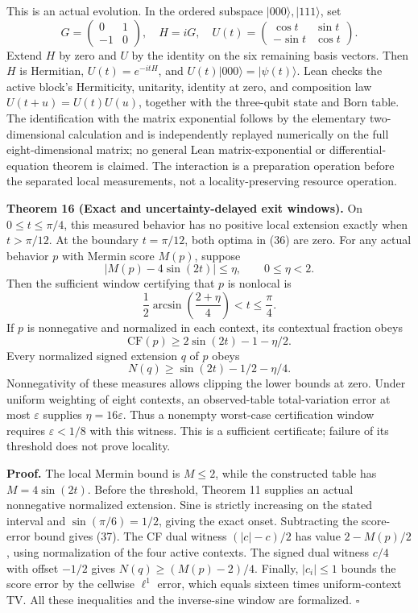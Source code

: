 \documentclass[
]{article}
\begin{document}
This is an actual evolution. In the ordered subspace \(|000\rangle,|111\rangle\), set
\[
G=\begin{pmatrix}0&1\\-1&0\end{pmatrix},\quad
H=iG,\quad
U(t)=\begin{pmatrix}\cos t&\sin t\\-\sin t&\cos t\end{pmatrix}.
\]
Extend \(H\) by zero and \(U\) by the identity on the six remaining basis vectors. Then \(H\) is Hermitian, \(U(t)=e^{-itH}\), and \(U(t)|000\rangle=|\psi(t)\rangle\). Lean checks the active block's Hermiticity, unitarity, identity at zero, and composition law \(U(t+u)=U(t)U(u)\), together with the three-qubit state and Born table. The identification with the matrix exponential follows by the elementary two-dimensional calculation and is independently replayed numerically on the full eight-dimensional matrix; no general Lean matrix-exponential or differential-equation theorem is claimed. The interaction is a preparation operation before the separated local measurements, not a locality-preserving resource operation.

\textbf{Theorem 16 (Exact and uncertainty-delayed exit windows).} On \(0\le t\le\pi/4\), this measured behavior has no positive local extension exactly when \(t>\pi/12\). At the boundary \(t=\pi/12\), both optima in (36) are zero. For any actual behavior \(p\) with Mermin score \(M(p)\), suppose
\[
|M(p)-4\sin(2t)|\le\eta,\qquad 0\le\eta<2.
\]
Then the sufficient window certifying that \(p\) is nonlocal is
\[
\frac12\arcsin\!\left(\frac{2+\eta}{4}\right)<t\le\frac\pi4.
\tag{37}
\]
If \(p\) is nonnegative and normalized in each context, its contextual fraction obeys
\[
\mathrm{CF}(p)\ge 2\sin(2t)-1-\eta/2.
\]
Every normalized signed extension \(q\) of \(p\) obeys
\[
N(q)\ge \sin(2t)-1/2-\eta/4.
\]
Nonnegativity of these measures allows clipping the lower bounds at zero. Under uniform weighting of eight contexts, an observed-table total-variation error at most \(\varepsilon\) supplies \(\eta=16\varepsilon\). Thus a nonempty worst-case certification window requires \(\varepsilon<1/8\) with this witness. This is a sufficient certificate; failure of its threshold does not prove locality.

\textbf{Proof.} The local Mermin bound is \(M\le2\), while the constructed table has \(M=4\sin(2t)\). Before the threshold, Theorem 11 supplies an actual nonnegative normalized extension. Sine is strictly increasing on the stated interval and \(\sin(\pi/6)=1/2\), giving the exact onset. Subtracting the score-error bound gives (37). The CF dual witness \((|c|-c)/2\) has value \(2-M(p)/2\), using normalization of the four active contexts. The signed dual witness \(c/4\) with offset \(-1/2\) gives \(N(q)\ge(M(p)-2)/4\). Finally, \(|c_i|\le1\) bounds the score error by the cellwise \(\ell^1\) error, which equals sixteen times uniform-context TV. All these inequalities and the inverse-sine window are formalized. \(\square\)
\end{document}
